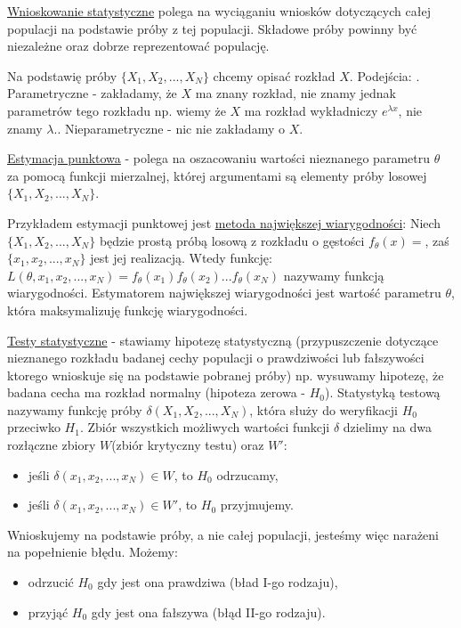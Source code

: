 \underline{Wnioskowanie statystyczne} polega na wyciąganiu wniosków dotyczących całej populacji na podstawie próby z tej populacji. Składowe próby powinny być niezależne oraz dobrze reprezentować populację.

Na podstawię próby $ \{X_1, X_2,...,X_N\} $ chcemy opisać rozkład $ X $. Podejścia: . Parametryczne - zakładamy, że $ X $ ma znany rozkład, nie znamy jednak parametrów tego rozkładu np. wiemy że $ X $ ma rozkład wykładniczy $ e^{\lambda x} $, nie znamy $ \lambda $.. Nieparametryczne - nic nie zakładamy o $ X $.

\underline{Estymacja punktowa} - polega na oszacowaniu wartości nieznanego parametru $ \theta $ za pomocą funkcji mierzalnej, której argumentami są elementy próby losowej $ \{X_1, X_2,...,X_N\} $.

Przykładem estymacji punktowej jest \underline{metoda największej wiarygodności}:\newline
Niech  $ \{X_1, X_2,..., X_N\} $ będzie prostą próbą losową z rozkładu o gęstości $ f_{\theta}(x) =  $, zaś $ \{x_1, x_2,..., x_N\} $ jest jej realizacją. Wtedy funkcję:\newline
$ L(\theta, x_1, x_2,..., x_N) = f_{\theta}(x_1)f_{\theta}(x_2)...f_{\theta}(x_N) $\newline
nazywamy funkcją wiarygodności. Estymatorem największej wiarygodności jest wartość parametru $ \theta $, która maksymalizuję funkcję wiarygodności.

\underline{Testy statystyczne} - stawiamy hipotezę statystyczną (przypuszczenie dotyczące nieznanego rozkładu badanej cechy populacji o prawdziwości lub fałszywości ktorego wnioskuje się na podstawie pobranej próby) np. wysuwamy hipotezę, że badana cecha ma rozkład normalny (hipoteza zerowa - $ H_0 $). Statystyką testową nazywamy funkcję próby $ \delta (X_1, X_2,..., X_N) $, która służy do weryfikacji $ H_0 $ przeciwko $ H_1 $. Zbiór wszystkich możliwych wartości funkcji $ \delta $ dzielimy na dwa rozłączne zbiory $ W $(zbiór krytyczny testu) oraz $ W' $:
\begin{itemize}
	\item jeśli $ \delta (x_1, x_2,..., x_N) \in W $, to $ H_0 $ odrzucamy,
	\item jeśli $ \delta (x_1, x_2,..., x_N) \in W' $, to $ H_0 $ przyjmujemy.
\end{itemize}

Wnioskujemy na podstawie próby, a nie całej populacji, jesteśmy więc narażeni na popełnienie błędu. Możemy:
\begin{itemize}
	\item odrzucić $ H_0 $ gdy jest ona prawdziwa (bład I-go rodzaju),
	\item przyjąć $ H_0 $ gdy jest ona fałszywa (błąd II-go rodzaju).
\end{itemize}

